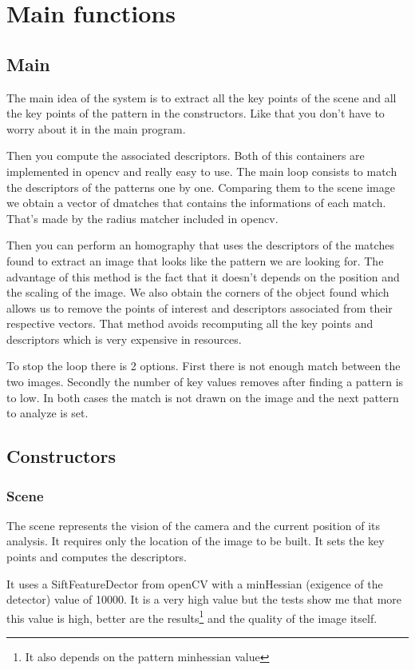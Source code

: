 \documentclass[english,a4paper,11pt]{report}
\begin{document}
	\section{Main functions}
	
	\subsection{Main}
	\par The main idea of the system is to extract all the key points of the scene and all the key points of the pattern in the constructors. Like that you don't have to worry about it in the main program. 
	\par	Then you compute the associated descriptors. Both of this containers are implemented in opencv and really easy to use. 
	The main loop consists to match the descriptors of the patterns one by one. Comparing them to the scene image we obtain a vector of dmatches that contains the informations of each match. That's made by the radius matcher included in opencv. 
	\par Then you can perform an homography  that uses the descriptors of the matches found to extract an image that looks like the pattern we are looking for. The advantage of this method is the fact that it doesn't depends on the position and the scaling of the image. We also obtain the corners of the object found which allows us to remove the points of interest and descriptors associated from their respective vectors. That method avoids recomputing all the key points and descriptors which is very expensive in resources. 
	\par To stop the loop there is 2 options. First there is not enough match between the two images. Secondly the number of key values removes after finding a pattern is to low. In both cases the match is not drawn on the image and the next pattern to analyze is set.
	\subsection{Constructors}
	\label{constructors}
	\subsubsection{Scene}
	\par The scene represents the vision of the camera and the current position of its analysis. 
	It requires only the location of the image to be built. It sets the key points and computes the descriptors. 
	\par It uses a SiftFeatureDector from openCV with a minHessian (exigence of the detector) value of 10000. It is a very high value but the tests show me that more this value is high, better are the results\footnote{It also depends on the pattern minhessian value} and the quality of the image itself.
	
\end{document}
